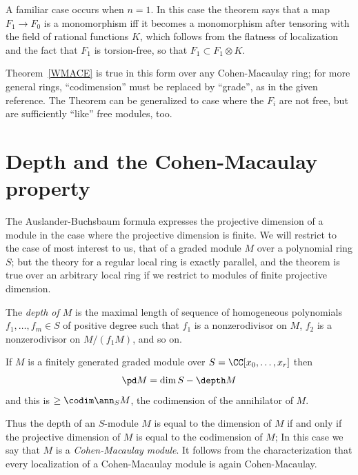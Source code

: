 A familiar case occurs when  $n=1$. In this case the theorem says that a map $F_1\to F_0$ is a monomorphism iff it becomes a monomorphism after tensoring with the field of rational functions $K$, which follows from the flatness of
localization and the fact that $F_1$ is torsion-free, so that
$F_1 \subset F_1 \otimes K$. 

\begin{fact}
Theorem~\ref{WMACE} is true in this form over any Cohen-Macaulay ring; for more general
rings, ``codimension'' must be replaced by ``grade'', as in the given reference.
The Theorem can be generalized
to case where the $F_i$ are not free, but are sufficiently ``like'' free modules, too.
\end{fact}


\section{Depth and the Cohen-Macaulay property}
The Auslander-Buchsbaum formula expresses the projective dimension of a module in the case where the projective dimension is finite. We will restrict to the case of most interest to us, that of a graded module $M$ over a polynomial ring $S$; but the
theory for a regular local ring is exactly parallel, and the theorem is true over an arbitrary local ring if we restrict to modules of finite projective dimension.

\begin{definition}
 The \emph{depth of $M$} is the maximal length of sequence of homogeneous polynomials $f_1,\dots,f_m \in S$ of positive degree such that $f_1$ is a nonzerodivisor on $M$, $f_2$ is a nonzerodivisor on $M/(f_1M)$, and so on. 
\end{definition}

\begin{theorem}\label{AB formula}
If $M$ is a finitely generated graded module over $S = \CC[x_0,\dots, x_r]$  then
$$
\pd M = \dim S - \depth M
$$
and this is $\geq \codim \ann_S M$, the codimension of the annihilator of $M$.
\end{theorem}

Thus the depth of an $S$-module $M$ is equal to the dimension of $M$ if and only if the projective dimension
of $M$ is equal to the codimension of $M$; In this case we say that $M$ is a
\emph{Cohen-Macaulay module}. It follows from the characterization that every localization of a Cohen-Macaulay
module is again Cohen-Macaulay.

